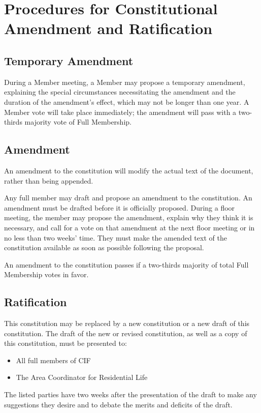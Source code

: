 \section{Procedures for Constitutional Amendment and Ratification}
\label{sec:amendment-and-ratification}



	\subsection{Temporary Amendment}

During a Member meeting, a Member may propose a temporary amendment, explaining the special circumstances necessitating the amendment and the duration of the amendment's effect, which may not be longer than one year. A Member vote will take place immediately; the amendment will pass with a two-thirds majority vote of Full Membership.



	\subsection{Amendment}

An amendment to the constitution will modify the actual text of the document, rather than being appended.

Any full member may draft and propose an amendment to the constitution. An amendment must be drafted before it is officially proposed. During a floor meeting, the member may propose the amendment, explain why they think it is necessary, and call for a vote on that amendment at the next floor meeting or in no less than two weeks' time. They must make the amended text of the constitution available as soon as possible following the proposal.

An amendment to the constitution passes if a two-thirds majority of total Full Membership votes in favor.



	\subsection{Ratification}

This constitution may be replaced by a new constitution or a new draft of this constitution. The draft of the new or revised constitution, as well as a copy of this constitution, must be presented to:
\begin{itemize}
	\item All full members of CIF
	\item The Area Coordinator for Residential Life
\end{itemize}
The listed parties have two weeks after the presentation of the draft to make any suggestions they desire and to debate the merits and deficits of the draft.

